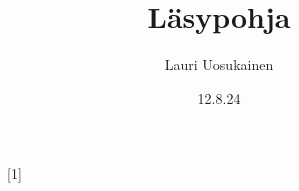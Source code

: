 \documentclass[12pt]{extarticle}
\title{\Huge{Läsypohja}}
\date{12.8.24}
\author{Lauri Uosukainen}
\begin{document}
\begin{titlepage}
    \begin{figure}[b!]
        \centering
        \scalebox{1}[1]{}%
    \end{figure}
\end{titlepage}



\newpage


\newpage
\centering







\newpage







\newpage
\text{}
\newpage

\renewcommand*\contentsname{Sisällysluettelo}
\begin{adjustwidth}{3cm}{0cm}
    \tableofcontents
\end{adjustwidth}
\end{document}
